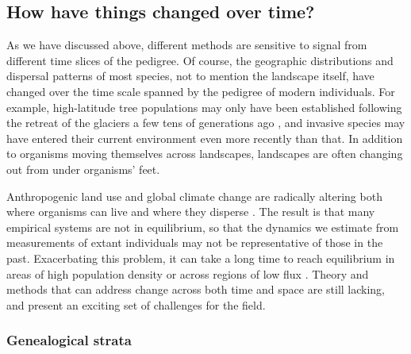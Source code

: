 \documentclass{ar-1col}
\newcommand{\g}[1]{{\color{blue}{#1}}}
\begin{document}
\g{estimating admixture?! could talk about the utility of chromosome painting etc.}

\subsection{How have things changed over time?}

As we have discussed above,
different methods are sensitive to signal
from different time slices of the pedigree.
Of course, the geographic distributions and dispersal patterns of most species,
not to mention the landscape itself,
have changed over the time scale spanned by the pedigree of modern individuals.
For example, 
high-latitude tree populations may only have been established
following the retreat of the glaciers
a few tens of generations ago \citep{WhitlockMcCauley1999},
and invasive species may have entered their current
environment even more recently than that.
In addition to organisms moving themselves across landscapes,
landscapes are often changing out from under organisms' feet.

Anthropogenic land use
and global climate change
are radically altering both where organisms can live
and where they disperse \citep{parmesan1999}.
The result is that many empirical systems
are not in equilibrium,
so that the dynamics we estimate from
measurements of extant individuals may
not be representative of those in the past.
Exacerbating this problem,
it can take a long time to reach equilibrium
in areas of high population density
or across regions of low flux
\citep{CrowAoki1984group, whitlock1992temporal, slatkin1993isolation, WhitlockMcCauley1999}.
Theory and methods that can address change across both time and space
are still lacking,
and present an exciting set of challenges for the field.

\subsubsection{Genealogical strata}
\end{document}
